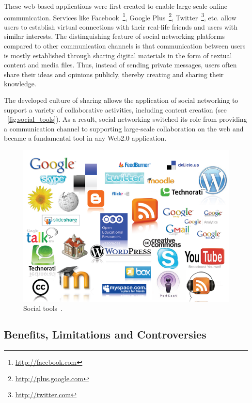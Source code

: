 \documentclass[ngerman,UKenglish,table]{scrbook}
\begin{document}
These web-based applications were first created to enable large-scale online communication.
Services like Facebook~\footnote{\url{http://facebook.com}}, Google Plus~\footnote{\url{http://plus.google.com}}, Twitter~\footnote{\url{http://twitter.com}}, etc. allow users to establish virtual connections with their real-life friends and users with similar interests.
The distinguishing feature of social networking platforms compared to other communication channels is that communication between users is mostly established through sharing digital materials in the form of textual content and media files.  
Thus, instead of sending private messages, users often share their ideas and opinions publicly, thereby creating and sharing their knowledge.

The developed culture of sharing allows the application of social networking to support a variety of collaborative activities, including content creation (see ~\autoref{fig:social_tools}).
As a result, social networking switched its role from providing a communication channel to supporting large-scale collaboration on the web and became a fundamental tool in any Web2.0 application. 

\begin{figure}[!ht]
\centering
\includegraphics[scale=1]{images/social_media.png}
\caption{Social tools~\cite{rodriguez}.}
\label{fig:social_tools}
\end{figure}



\subsection{Benefits, Limitations and Controversies}
\end{document}
